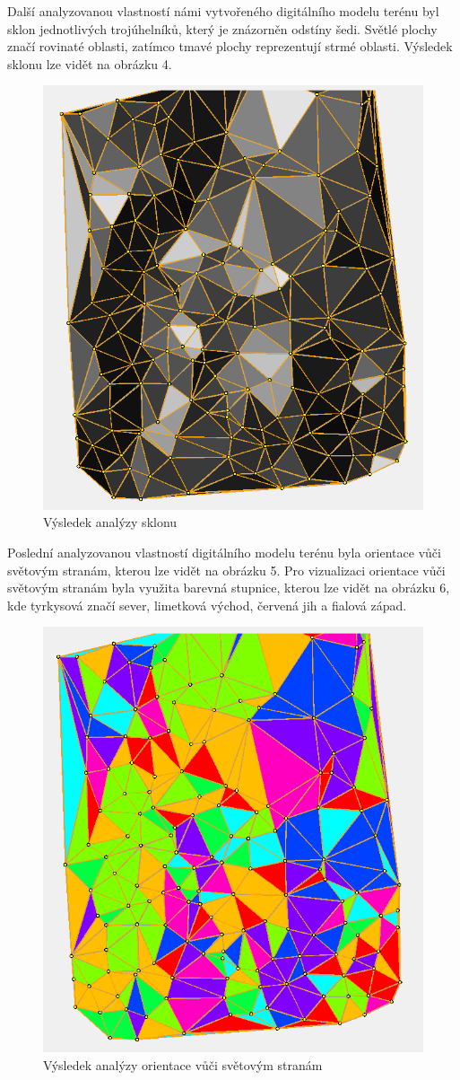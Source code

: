 \documentclass{article}
\begin{document}
\begin{spacing}{1.5}
Další analyzovanou vlastností námi vytvořeného digitálního modelu terénu byl sklon jednotlivých trojúhelníků, který je znázorněn odstíny šedi. Světlé plochy značí rovinaté oblasti, zatímco tmavé plochy reprezentují strmé oblasti. Výsledek sklonu lze vidět na obrázku 4. 

\begin{figure}[htbp]
    \centering
    \includegraphics[width=0.45\linewidth]{images/04sklon.png}
    \caption{Výsledek analýzy sklonu}
    \label{fig:enter-label}
\end{figure}

\newpage
Poslední analyzovanou vlastností digitálního modelu terénu byla orientace vůči světovým stranám, kterou lze vidět na obrázku 5. Pro vizualizaci orientace vůči světovým stranám byla využita barevná stupnice, kterou lze vidět na obrázku 6, kde tyrkysová značí sever, limetková východ, červená jih a fialová západ.

\begin{figure}[htbp]
    \centering
    \includegraphics[width=0.45\linewidth]{images/05orientace.png}
    \caption{Výsledek analýzy orientace vůči světovým stranám}
    \label{fig:enter-label}
\end{figure}


\end{spacing}
\end{document}
